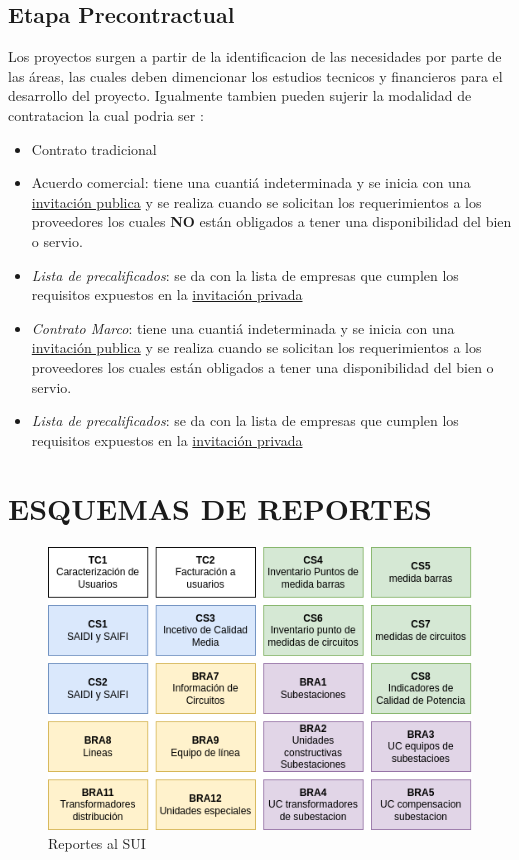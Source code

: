 \documentclass[a5paper]{book}%
\begin{document}
\section{Etapa Precontractual}

Los proyectos surgen a partir de la identificacion de las necesidades por parte de las áreas, las cuales deben dimencionar los estudios tecnicos y financieros para el desarrollo del proyecto. Igualmente tambien pueden sujerir la modalidad de contratacion la cual podria ser :

\begin{itemize}
	\item Contrato tradicional 
	\item Acuerdo comercial: tiene  una cuantiá indeterminada y se inicia con una \underline{invitación publica}  y se realiza cuando se solicitan los requerimientos a los proveedores los cuales \textbf{NO} están obligados a tener una disponibilidad del bien o servio.
	\item \textit{Lista de precalificados}: se da con la lista de empresas que cumplen los requisitos expuestos en la \underline{invitación privada}
	\item \textit{Contrato Marco}: tiene  una cuantiá indeterminada y se inicia con una \underline{invitación publica}  y se realiza cuando se solicitan los requerimientos a los proveedores los cuales están obligados a tener una disponibilidad del bien o servio.
	\item \textit{Lista de precalificados}: se da con la lista de empresas que cumplen los requisitos expuestos en la \underline{invitación privada}
\end{itemize}


\chapter{ESQUEMAS DE REPORTES}

\begin{figure}[H]
  \centering
  \caption{Reportes al SUI}
  \label{fig:sui}
  \includegraphics[width=\linewidth]{SUI}
\end{figure}
\end{document}
